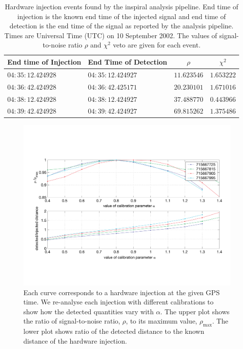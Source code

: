 \begin{table}[p]
  \begin{flushright}
  \begin{tabular}{l|l|c|c}
  End time of Injection&End Time of Detection&$\rho$&$\chi^2$\\
  \hline
  $04:35:12.424928$ & $04:35:12.424927$ & $11.623546$ & $1.653222$ \\
  $04:36:42.424928$ & $04:36:42.425171$ & $20.230101$ & $1.671016$ \\
  $04:38:12.424928$ & $04:38:12.424927$ & $37.488770$ & $0.443966$ \\
  $04:39:42.424928$ & $04:39:42.424927$ & $69.815262$ & $1.375486$ \\
  \end{tabular}
  \end{flushright}
  \caption[Hardware Injections Found by the Analysis Pipeline]{%
  Hardware injection events found by the inspiral analysis pipeline. End time
  of injection is the known end time of the injected signal and end time of
  detection is the end time of the signal as reported by the analysis
  pipeline. Times are Universal Time (UTC) on 10 September 2002. The values of
  signal-to-noise ratio $\rho$ and $\chi^2$ veto are given for each event.
  }
\label{t:triggers}
\end{table}

\begin{figure}[p]
  \vspace{5pt}
  \begin{flushright}
    \includegraphics[width=\textwidth]{figures/hardware/calibration}    
  \end{flushright}
  \caption[Study of Calibration Using Hardware Injections]{%
  Each curve corresponds to a hardware injection at the given GPS time. We
  re-analyse each injection with different calibrations to show how the
  detected quantities vary with $\alpha$. The upper plot shows the ratio of
  signal-to-noise ratio, $\rho$, to its maximum value, $\rho_{\mathrm{max}}$.
  The lower plot shows ratio of the detected distance to the known distance of
  the hardware injection.
  }
\label{f:calibration}
\end{figure}

